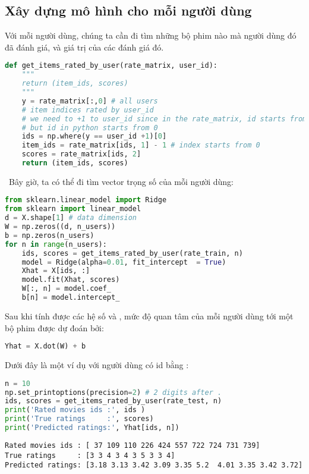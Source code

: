 \subsection{Xây dựng mô hình cho mỗi người dùng}
Với mỗi người dùng, chúng ta cần đi tìm những bộ phim nào mà
người dùng đó đã đánh giá, và giá trị của các đánh giá đó.
\begin{lstlisting}[language=Python]
def get_items_rated_by_user(rate_matrix, user_id):
    """
    return (item_ids, scores)
    """
    y = rate_matrix[:,0] # all users
    # item indices rated by user_id
    # we need to +1 to user_id since in the rate_matrix, id starts from 1
    # but id in python starts from 0
    ids = np.where(y == user_id +1)[0]
    item_ids = rate_matrix[ids, 1] - 1 # index starts from 0
    scores = rate_matrix[ids, 2]
    return (item_ids, scores)
\end{lstlisting}
\
Bây giờ, ta có thể đi tìm vector trọng số của mỗi người dùng:

\begin{lstlisting}[language=Python]
from sklearn.linear_model import Ridge
from sklearn import linear_model
d = X.shape[1] # data dimension
W = np.zeros((d, n_users))
b = np.zeros(n_users)
for n in range(n_users):
    ids, scores = get_items_rated_by_user(rate_train, n)
    model = Ridge(alpha=0.01, fit_intercept  = True)
    Xhat = X[ids, :]
    model.fit(Xhat, scores)
    W[:, n] = model.coef_
    b[n] = model.intercept_
\end{lstlisting}

Sau khi tính được các hệ số  và ,
mức độ quan tâm của mỗi người dùng tới một bộ phim được dự đoán
bởi:
\begin{lstlisting}[language=Python]
Yhat = X.dot(W) + b
\end{lstlisting}

Dưới đây là một ví dụ với người dùng có {id} bằng :

\begin{lstlisting}[language=Python]
n = 10
np.set_printoptions(precision=2) # 2 digits after .
ids, scores = get_items_rated_by_user(rate_test, n)
print('Rated movies ids :', ids )
print('True ratings     :', scores)
print('Predicted ratings:', Yhat[ids, n])
\end{lstlisting}
\kq
\begin{lstlisting}
Rated movies ids : [ 37 109 110 226 424 557 722 724 731 739]
True ratings     : [3 3 4 3 4 3 5 3 3 4]
Predicted ratings: [3.18 3.13 3.42 3.09 3.35 5.2  4.01 3.35 3.42 3.72]
\end{lstlisting}

